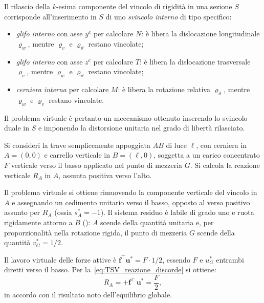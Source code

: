 \begin{oss}
	Il rilascio della $k$-esima componente del vincolo di
	rigidità in una sezione $S$ corrisponde all'inserimento
	in $S$ di uno \emph{svincolo interno} di tipo specifico:
	\begin{itemize}[noitemsep]
		\item \emph{glifo interno} con asse $y^e$ per
		calcolare $N$: è libera la dislocazione
		longitudinale $\varrho_w$, mentre $\varrho_v$ e
		$\varrho_\vartheta$ restano vincolate;
		\item \emph{glifo interno} con asse $z^e$ per
		calcolare $T$: è libera la dislocazione trasversale
		$\varrho_v$, mentre $\varrho_w$ e $\varrho_\vartheta$
		restano vincolate;
		\item \emph{cerniera interna} per calcolare $M$: è
		libera la rotazione relativa $\varrho_\vartheta$,
		mentre $\varrho_w$ e $\varrho_v$ restano vincolate.
	\end{itemize}
	Il problema virtuale è pertanto un meccanismo ottenuto
	inserendo lo svincolo duale in $S$ e imponendo la
	distorsione unitaria nel grado di libertà rilasciato.
\end{oss}


\begin{esempio}
	\label{ex:TSV_trave_semplice}
	
	Si consideri la trave semplicemente appoggiata $AB$ di
	luce $\ell$, con cerniera in $A = (0,0)$ e carrello
	verticale in $B = (\ell, 0)$, soggetta a un carico
	concentrato $F$ verticale verso il basso applicato nel
	punto di mezzeria $G$. Si calcola la reazione verticale
	$R_A$ in $A$, assunta positiva verso l'alto.
	
	Il problema virtuale si ottiene rimuovendo la componente
	verticale del vincolo in $A$ e assegnando un cedimento
	unitario verso il basso, opposto al verso positivo
	assunto per $R_A$ (ossia $s^*_A = -1$). Il sistema
	residuo è labile di grado uno e ruota rigidamente
	attorno a $B$ (): $A$
	scende della quantità unitaria e, per proporzionalità
	nella rotazione rigida, il punto di mezzeria $G$ scende
	della quantità $v^*_G = 1/2$.
	



	
	Il lavoro virtuale delle forze attive è $\bm{f}^\top
	\bm{u}^* = F \cdot 1/2$, essendo $F$ e $u^*_G$ entrambi
	diretti verso il basso. Per
	la~\eqref{eq:TSV_reazione_discorde} si ottiene:
	\begin{equation*}
		R_A = +\bm{f}^\top\,\bm{u}^* = \frac{F}{2},
	\end{equation*}
	in accordo con il risultato noto dell'equilibrio globale.
	
\end{esempio}


